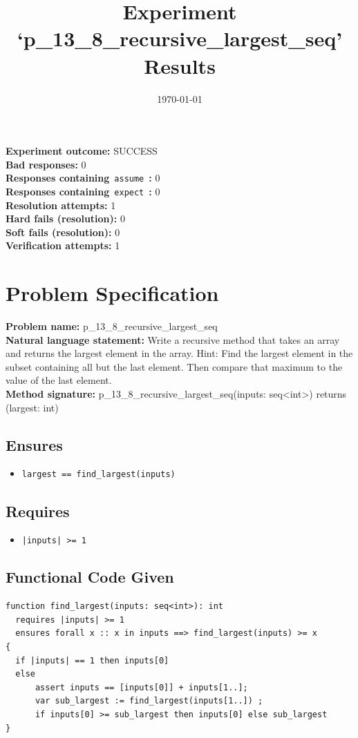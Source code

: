 \documentclass{article}
\begin{document}
\title{Experiment `p\_13\_8\_recursive\_largest\_seq' Results}
\author{\today}
\date{}
\maketitle
\textbf{Experiment outcome: }SUCCESS
\\\textbf{Bad responses: }0
\\\textbf{Responses containing}~\texttt{assume}~\textbf{: }0
\\\textbf{Responses containing}~\texttt{expect}~\textbf{: }0
\\\textbf{Resolution attempts: }1
\\\textbf{Hard fails (resolution): }0
\\\textbf{Soft fails (resolution): }0
\\\textbf{Verification attempts: }1
\section*{Problem Specification}
\textbf{Problem name: }p\_13\_8\_recursive\_largest\_seq
\\\textbf{Natural language statement: }Write a recursive method that takes an array and returns the largest element in the array. Hint: Find the largest element in the subset containing all but the last element. Then compare that maximum to the value of the last element.
\\\textbf{Method signature: }p\_13\_8\_recursive\_largest\_seq(inputs: seq<int>) returns (largest: int)
\subsection*{Ensures}
\begin{itemize}
\item \texttt{largest == find\_largest(inputs)}
\end{itemize}
\subsection*{Requires}
\begin{itemize}
\item \texttt{|inputs| >= 1}
\end{itemize}
\subsection*{Functional Code Given}
\begin{lstlisting}
function find_largest(inputs: seq<int>): int
  requires |inputs| >= 1
  ensures forall x :: x in inputs ==> find_largest(inputs) >= x
{
  if |inputs| == 1 then inputs[0]
  else 
      assert inputs == [inputs[0]] + inputs[1..];
      var sub_largest := find_largest(inputs[1..]) ;
      if inputs[0] >= sub_largest then inputs[0] else sub_largest
}
\end{lstlisting}
\clearpage
\end{document}
